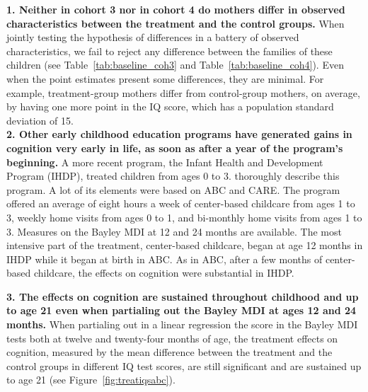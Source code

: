 \begin{appendices}
\noindent \textbf{1. Neither in cohort 3 nor in cohort 4 do mothers differ in observed characteristics between the treatment and the control groups.} When jointly testing the hypothesis of differences in a battery of observed characteristics, we fail to reject any difference between the families of these children (see Table~\ref{tab:baseline_coh3} and Table~\ref{tab:baseline_coh4}). Even when the point estimates present some differences, they are minimal. For example, treatment-group mothers differ from control-group mothers, on average, by having one more point in the IQ score, which has a population standard deviation of 15.\\

\noindent \textbf{2. Other early childhood education programs have generated gains in cognition very early in life, as soon as after a year of the program's beginning.} A more recent program, the Infant Health and Development Program (IHDP), treated children from ages 0 to 3. \citet{Gross_Spiker_etal_1997_BOOKHelpinglowbirth} thoroughly describe this program. A lot of its elements were based on ABC and CARE. The program offered an average of eight hours a week of center-based childcare from ages 1 to 3, weekly home visits from ages 0 to 1, and bi-monthly home visits from ages 1 to 3. Measures on the Bayley MDI at 12 and 24 months are available. The most intensive part of the treatment, center-based childcare, began at age 12 months in IHDP while it began at birth in ABC. As in ABC, after a few months of center-based childcare, the effects on cognition were substantial in IHDP.


\noindent \textbf{3. The effects on cognition are sustained throughout childhood and up to age 21 even when partialing out the Bayley MDI at ages 12 and 24 months.} When partialing out in a linear regression the score in the Bayley MDI tests both at twelve and twenty-four months of age, the treatment effects on cognition, measured by the mean difference between the treatment and the control groups in different IQ test scores, are still significant and are sustained up to age 21 (see Figure~\ref{fig:treatiqsabc}).


\end{appendices}
